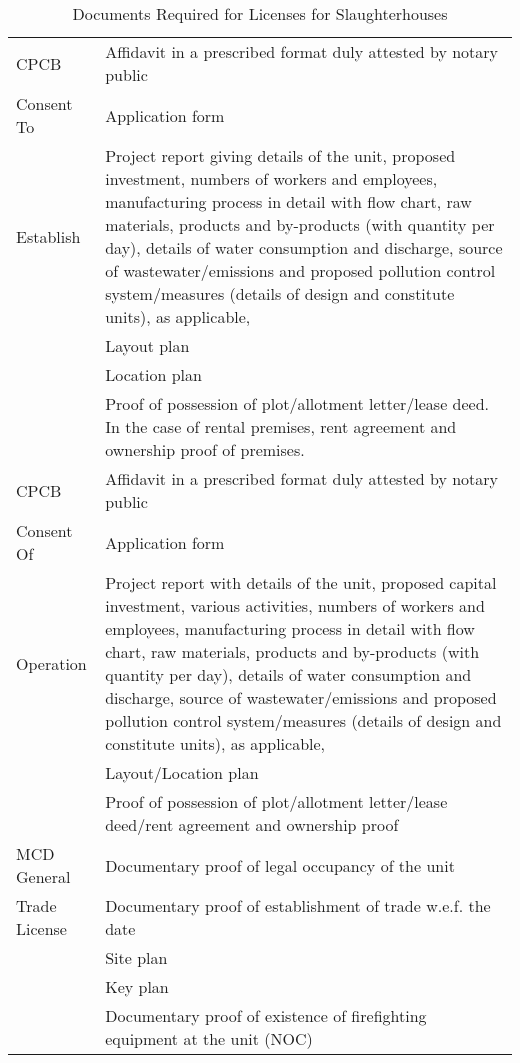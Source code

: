 \documentclass[a4paper, 12pt]{article}
\begin{document}
\begin{longtable}{>{\raggedright}p{2.5cm}>{\raggedright\arraybackslash}p{13cm}}
\caption{Documents Required for Licenses for Slaughterhouses} \\
\midrule
\endfirsthead
   CPCB  & Affidavit in a prescribed format duly attested by notary public \\
   Consent  To  & Application form \\
   Establish &  Project report giving details of the unit, proposed investment, numbers of workers and employees, manufacturing process in detail with flow chart, raw materials, products and by-products (with quantity per day), details of water consumption and discharge, source of wastewater/emissions and proposed pollution control system/measures (details of design and constitute units), as applicable, \\
          & Layout plan \\
          & Location plan \\
          & Proof of possession of plot/allotment letter/lease deed. In the case of rental premises, rent agreement and ownership proof of premises. \\
    \midrule
    CPCB  & Affidavit in a prescribed format duly attested by notary public \\
    Consent Of  & Application form \\
   Operation &  Project report with details of the unit, proposed capital investment, various activities, numbers of workers and employees, manufacturing process in detail with flow chart, raw materials, products and by-products (with quantity per day), details of water consumption and discharge, source of wastewater/emissions and proposed pollution control system/measures (details of design and constitute units), as applicable, \\
          & Layout/Location plan \\
          & Proof of possession of plot/allotment letter/lease deed/rent agreement and ownership proof  \\
    \midrule
    MCD General & Documentary proof of legal occupancy of the unit \\
    Trade License & Documentary proof of establishment of trade w.e.f. the date \\
    & Site plan \\
    & Key plan \\
          & Documentary proof of existence of firefighting equipment at the unit (NOC) \\

\end{longtable}
\end{document}
